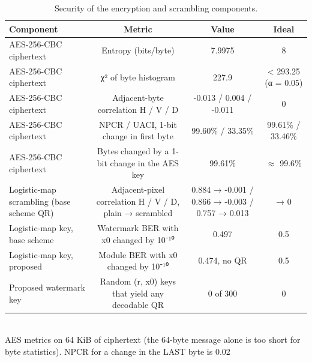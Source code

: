 \begin{table}[t]
\centering
\small
\caption{Security of the encryption and scrambling components.}
\begin{tabular}{lccc}
\toprule
Component & Metric & Value & Ideal \\
\midrule
AES-256-CBC ciphertext & Entropy (bits/byte) & 7.9975 & 8 \\
AES-256-CBC ciphertext & χ² of byte histogram & 227.9 & < 293.25 (α = 0.05) \\
AES-256-CBC ciphertext & Adjacent-byte correlation H / V / D & -0.013 / 0.004 / -0.011 & 0 \\
AES-256-CBC ciphertext & NPCR / UACI, 1-bit change in first byte & 99.60\% / 33.35\% & 99.61\% / 33.46\% \\
AES-256-CBC ciphertext & Bytes changed by a 1-bit change in the AES key & 99.61\% & $\approx$ 99.6\% \\
Logistic-map scrambling (base scheme QR) & Adjacent-pixel correlation H / V / D, plain → scrambled & 0.884 → -0.001 / 0.866 → -0.003 / 0.757 → 0.013 & → 0 \\
Logistic-map key, base scheme & Watermark BER with x0 changed by 10⁻¹⁰ & 0.497 & 0.5 \\
Logistic-map key, proposed & Module BER with x0 changed by 10⁻¹⁰ & 0.474, no QR & 0.5 \\
Proposed watermark key & Random (r, x0) keys that yield any decodable QR & 0 of 300 & 0 \\
\bottomrule
\end{tabular}
\\[2pt]\footnotesize AES metrics on 64 KiB of ciphertext (the 64-byte message alone is too short for byte statistics). NPCR for a change in the LAST byte is 0.02%
\end{table}

